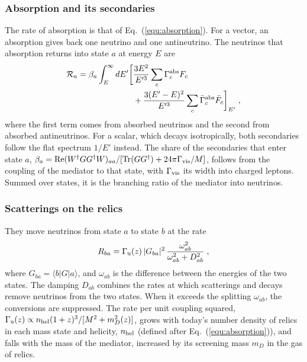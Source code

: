 \documentclass[linenumbers, aps, prd, twocolumn, superscriptaddress, floatfix, longbibliography, nofootinbib, bibnotes]{revtex4-2}
\begin{document}
\subsubsection{Absorption and its secondaries}
The rate of absorption is that of Eq.~(\ref{equ:absorption}).
For a vector, an absorption gives back one neutrino and one antineutrino.
The neutrinos that absorption returns into state $a$ at energy $E$ are
\begin{equation}
 \label{equ:secondaries}
 \begin{split}
 \mathcal{R}_a = \beta_a \int_E^\infty dE' \bigg[ & \frac{3E^2}{E'^3} \sum_c \Gamma^{\rm abs}_c F_c \\
 & + \frac{3(E'-E)^2}{E'^3} \sum_c \bar\Gamma^{\rm abs}_c \bar F_c \bigg]_{E'} \;,
 \end{split}
\end{equation}
where the first term comes from absorbed neutrinos and the second from absorbed antineutrinos.
For a scalar, which decays isotropically, both secondaries follow the flat spectrum $1/E'$ instead.
The share of the secondaries that enter state $a$, $\beta_a = {\rm Re}(W^\dagger G G^\dagger W)_{aa} / [{\rm Tr}(G G^\dagger) + 24\pi\Gamma_{\rm vis}/M]$, follows from the coupling of the mediator to that state, with $\Gamma_{\rm vis}$ its width into charged leptons.
Summed over states, it is the branching ratio of the mediator into neutrinos.

\subsubsection{Scatterings on the relics}
They move neutrinos from state $a$ to state $b$ at the rate
\begin{equation}
 \label{equ:soft}
 R_{ba} = \Gamma_{\rm u}(z)\, |G_{ba}|^2\, \frac{\omega_{ab}^2}{\omega_{ab}^2 + D_{ab}^2} \;,
\end{equation}
where $G_{ba} = \langle b|G|a\rangle$, and $\omega_{ab}$ is the difference between the energies of the two states.
The damping $D_{ab}$ combines the rates at which scatterings and decays remove neutrinos from the two states.
When it exceeds the splitting $\omega_{ab}$, the conversions are suppressed.
The rate per unit coupling squared, $\Gamma_{\rm u}(z) \propto n_{\rm hel} (1+z)^3 / [M^2 + m_D^2(z)]$, grows with today's number density of relics in each mass state and helicity, $n_{\rm hel}$ (defined after Eq.~(\ref{equ:absorption})), and falls with the mass of the mediator, increased by its screening mass $m_D$ in the gas of relics.
\end{document}
